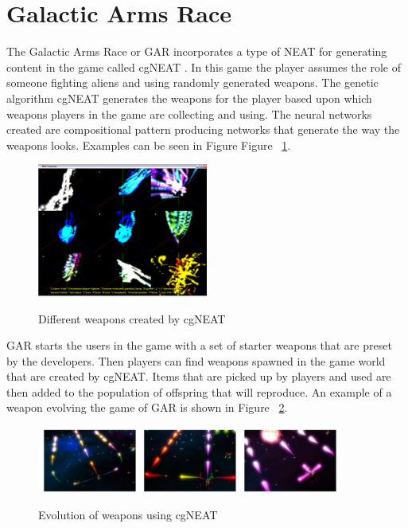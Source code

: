 \documentclass[12pt]{ucthesis} \newif\ifpdf \ifx\pdfoutput\undefined
\begin{document}
\section{Galactic Arms Race}

The Galactic Arms Race or GAR incorporates a type of NEAT for generating content
in the game called cgNEAT \cite{hastings2009evolving}. In this game the player
assumes the role of someone fighting aliens and using randomly generated
weapons.
The genetic algorithm cgNEAT generates the weapons for the player based
upon which weapons players in the game are collecting and using. The
neural networks created are compositional pattern producing networks that
generate the way the weapons looks\cite{hastings2009evolving}. Examples can be
seen in Figure Figure ~\ref{fig:weapons}.

\begin{figure}[h!] 
\caption{Different weapons created by cgNEAT}
  \centering
    \includegraphics[width=0.5\textwidth]{weapons.jpg}
   \label{fig:weapons} 
\end{figure}

GAR starts the users in the game with a set of starter weapons that are preset
by the developers. Then players can find weapons spawned in the game world that
are created by cgNEAT. Items that are picked up by players and used are then
added to the population of offspring that will reproduce. An example of a weapon
evolving the game of GAR is shown in Figure ~\ref{fig:evoguns}.

\begin{figure}[h!] 
\caption{Evolution of weapons using cgNEAT}
  \centering
    \includegraphics[width=0.9\textwidth]{evoguns.png}
   \label{fig:evoguns} 
\end{figure}
\end{document}
